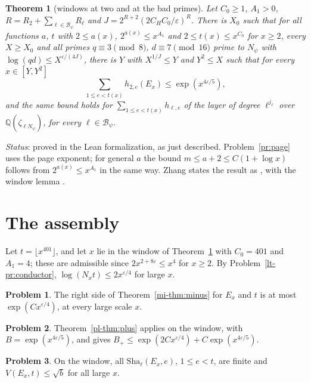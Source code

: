 \documentclass[reqno]{amsart}
\theoremstyle{definition}
\newtheorem{problem}{Problem}[section]
\theoremstyle{plain}
\newtheorem{theorem}{Theorem}[section]
\theoremstyle{remark}
\newcommand{\Q}{\mathbb{Q}}
\newcommand{\Bc}{\mathcal{B}}
\newcommand{\Sha}{\mathrm{Sha}}
\begin{document}
\begin{theorem}[windows at two and at the bad primes]\label{thm:bab}
Let \(C_0\ge1\), \(A_1>0\), \(R=R_2+\sum_{\ell\in\Bc_\psi}R_\ell\) and \(J=2^{R+2}(2C_HC_0/\varepsilon)^R\).  There is \(X_0\) such that for all functions \(a\), \(t\) with \(2\le a(x)\), \(2^{a(x)}\le x^{A_1}\) and \(2\le t(x)\le x^{C_0}\) for \(x\ge2\), every \(X\ge X_0\) and all primes \(q\equiv3\pmod8\), \(d\equiv7\pmod{16}\) prime to \(N_\psi\) with \(\log(qd)\le X^{\varepsilon/(4J)}\), there is \(Y\) with \(X^{1/J}\le Y\) and \(Y^2\le X\) such that for every \(x\in[Y,Y^2]\)
\[
 \sum_{1\le e<t(x)}h_{2,e}(E_x)\le\exp(x^{4\varepsilon/5}),
\]
and the same bound holds for \(\sum_{1\le e<t(x)}h_{\ell,e}\) of the layer of degree \(\ell^{j_\ell}\) over \(\Q(\zeta_{\ell N_\psi})\), for every \(\ell\in\Bc_\psi\).
\end{theorem}

\noindent\emph{Status}: proved in the Lean formalization, as just described.  Problem~\ref{pr:page} uses the page exponent; for general \(a\) the bound \(m\le a+2\le C(1+\log x)\) follows from \(2^{a(x)}\le x^{A_1}\) in the same way.  Zhang states the result as \cite[Prop.~5.3]{Zh}, with the window lemma \cite[Lemma~5.5]{Zh}.

\section{The assembly}\label{sec:assembly}

Let \(t=\lfloor x^{401}\rfloor\), and let \(x\) lie in the window of Theorem~\ref{thm:bab} with \(C_0=401\) and \(A_1=4\); these are admissible since \(2x^{2+8\varepsilon}\le x^4\) for \(x\ge2\).  By Problem~\ref{lt-pr:conductor}, \(\log(N_xt)\le2x^{\varepsilon/4}\) for large \(x\).

\begin{problem}\label{pr:minus-bound}
The right side of Theorem~\ref{mi-thm:minus} for \(E_x\) and \(t\) is at most \(\exp(Cx^{\varepsilon/4})\), at every large scale \(x\).
\end{problem}

\begin{problem}\label{pr:plus-bound}
Theorem~\ref{pl-thm:plus} applies on the window, with \(B=\exp(x^{4\varepsilon/5})\), and gives \(B_+\le\exp(2Cx^{\varepsilon/4})+C\exp(x^{4\varepsilon/5})\).
\end{problem}

\begin{problem}\label{pr:total}
On the window, all \(\Sha_\ell(E_x,e)\), \(1\le e<t\), are finite and \(V(E_x,t)\le\sqrt b\) for all large \(x\).
\end{problem}
\end{document}
